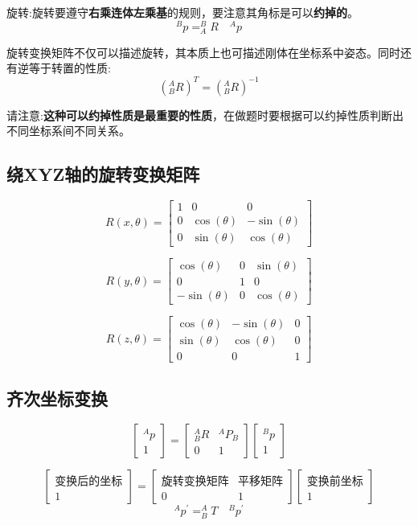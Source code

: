 \documentclass[12pt, a4paper, oneside]{ctexbook}
\begin{document}
旋转:旋转要遵守\textbf{右乘连体左乘基}的规则，要注意其角标是可以\textbf{约掉的}。
$$
^{B}p=^{B}_{A}R {\quad} ^{A}p
$$

旋转变换矩阵不仅可以描述旋转，其本质上也可描述刚体在坐标系中姿态。同时还有逆等于转置的性质:
$$
(^{A}_{B}R)^{T}=(^{A}_{B}R)^{-1}
$$

请注意:\textbf{这种可以约掉性质是最重要的性质}，在做题时要根据可以约掉性质判断出不同坐标系间不同关系。
\subsection{绕XYZ轴的旋转变换矩阵}

$$
R(x,\theta)=
\left[
\begin{matrix}
	1 & 0 & 0\\
	0 & \cos(\theta) & -\sin(\theta)\\
	0 & \sin(\theta) & \cos(\theta)
\end{matrix}
\right]
$$

$$
R(y,\theta)=
\left[
\begin{matrix}
	\cos(\theta) & 0 & \sin(\theta)\\
	0 & 1 & 0\\
	-\sin(\theta) & 0 & \cos(\theta)
\end{matrix}
\right]
$$

$$
R(z,\theta)=
\left[
\begin{matrix}
	\cos(\theta) & -\sin(\theta) & 0\\
	\sin(\theta) & \cos(\theta) & 0\\
	0 & 0 & 1
\end{matrix}
\right]
$$
\subsection{齐次坐标变换}

$$
\left[
\begin{matrix}
	^{A}p\\
	1
\end{matrix}
\right]=
\left[
\begin{matrix}
	^{A}_{B}R & ^{A}P_B\\
	0 & 1
\end{matrix}
\right]
\left[
\begin{matrix}
	^{B}p\\
	1
\end{matrix}
\right]
$$

$$
\left[
\begin{matrix}
	\mbox{变换后的坐标}\\
	1
\end{matrix}
\right]=
\left[
\begin{matrix}
	\mbox{旋转变换矩阵} & \mbox{平移矩阵}\\
	0 & 1
\end{matrix}
\right]
\left[
\begin{matrix}
	\mbox{变换前坐标}\\
	1
\end{matrix}
\right]
$$
$$
^{A}p^{'}=^{A}_{B}T {\quad} ^{B}p^{'}
$$
\end{document}
